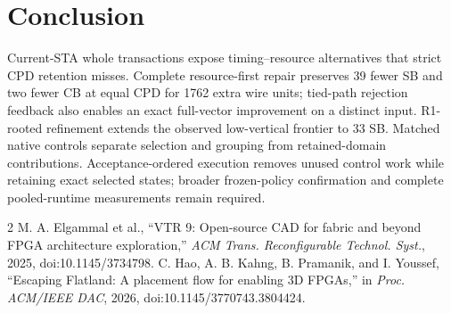 \documentclass[conference,10pt]{IEEEtran}
\begin{document}
\section{Conclusion}
Current-STA whole transactions expose timing--resource alternatives that strict CPD retention misses. Complete resource-first repair preserves 39 fewer SB and two fewer CB at equal CPD for 1762 extra wire units; tied-path rejection feedback also enables an exact full-vector improvement on a distinct input. R1-rooted refinement extends the observed low-vertical frontier to 33 SB. Matched native controls separate selection and grouping from retained-domain contributions. Acceptance-ordered execution removes unused control work while retaining exact selected states; broader frozen-policy confirmation and complete pooled-runtime measurements remain required.

\begin{thebibliography}{2}
 M. A. Elgammal et al., ``VTR 9: Open-source CAD for fabric and beyond FPGA architecture exploration,'' \emph{ACM Trans. Reconfigurable Technol. Syst.}, 2025, doi:10.1145/3734798.
 C. Hao, A. B. Kahng, B. Pramanik, and I. Youssef, ``Escaping Flatland: A placement flow for enabling 3D FPGAs,'' in \emph{Proc. ACM/IEEE DAC}, 2026, doi:10.1145/3770743.3804424.
\end{thebibliography}
\end{document}
